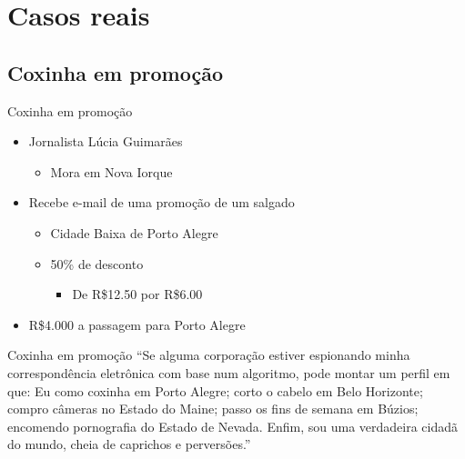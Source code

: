 \documentclass[dvipdfm]{beamer}
\begin{document}
\section{Casos reais}

\subsection{Coxinha em promoção}
\begin{frame}{Coxinha em promoção}
	\begin{itemize}
		\item Jornalista Lúcia Guimarães
		\begin{itemize}
			\item Mora em Nova Iorque
		\end{itemize}
		\item Recebe e-mail de uma promoção de um salgado
		\begin{itemize}
			\item Cidade Baixa de Porto Alegre
			\item 50\% de desconto
			\begin{itemize}
				\item De R\$12.50 por R\$6.00
			\end{itemize}
		\end{itemize}
		\item R\$4.000 a passagem para Porto Alegre
	\end{itemize}
\end{frame}

\begin{frame}{Coxinha em promoção}
``Se alguma corporação estiver espionando minha correspondência eletrônica com base num algoritmo, pode montar um perfil em que: 
		Eu como coxinha em Porto Alegre; 
		corto o cabelo em Belo Horizonte; 
		compro câmeras no Estado do Maine; 
		passo os fins de semana em Búzios; 
		encomendo pornografia do Estado de Nevada. 
		Enfim, sou uma verdadeira cidadã do mundo, cheia de caprichos e perversões.''
\end{frame}
\end{document}
